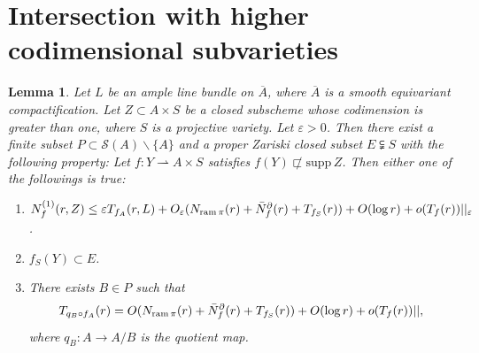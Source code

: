 \documentclass[11pt,english]{smfart}
\theoremstyle{plain}
\newtheorem{lem}[thm]{Lemma}
\theoremstyle{definition}
\theoremstyle{remark}
\numberwithin{equation}{section}
\theoremstyle{plain}
\newcommand{\da}{\rightharpoonup}
\newcommand{\pN}[1]{\bar{N}_{#1}^{\partial}}
\newcommand{\ram}{{\rm ram}\,}
\begin{document}
		
		
		
		
		
		
		
		
		
	
	\section{Intersection with higher codimensional subvarieties}
	
	
	
	
	
	\begin{lem}\label{lem:202209151}
		Let $L$ be an ample line bundle on $\overline{A}$, where $\overline{A}$ is a smooth equivariant compactification.
		Let $Z\subset A\times S$ be a closed subscheme whose codimension is greater than one, where $S$ is a projective variety.
		Let $\varepsilon>0$.
		Then there exist a finite subset $P\subset \mathcal{S}(A)\backslash\{A\}$ and a proper Zariski closed subset $E\subsetneqq S$ with the following property:
		Let $f:Y\da A\times S$ satisfies $f(Y)\not\sqsubset \mathrm{supp}\, Z$.
		Then either one of the followings is true:
		\begin{enumerate}
			\item
			$
			N^{(1)}_f(r,Z)\leq \varepsilon T_{f_A}(r,L)+O_{\varepsilon}(N_{\ram\pi}(r)+\pN{f}(r)
			+T_{f_S}(r))+O(\log r)+o(T_f(r))||_{\varepsilon}$.
			\item
			$f_S(Y)\subset E$.
			\item
			There exists $B\in P$ such that 
			$$
			T_{q_B\circ f_A}(r)=O(N_{\ram\pi}(r)+\pN{f}(r)+T_{f_S}(r))+O(\log r)+o(T_f(r))||, 
			$$
			where $q_B:A\to A/B$ is the quotient map.
		\end{enumerate}
	\end{lem}
	
	
	
\end{document}
